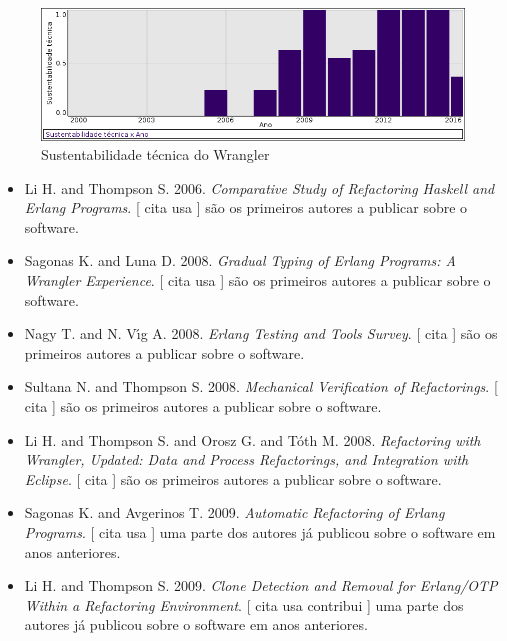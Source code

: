 \begin{figure}[h]
  \center
  \includegraphics[scale=0.50]{imagens/softwares-charts/wrangler.png}
  \caption{Sustentabilidade técnica do Wrangler}
\end{figure}


\begin{itemize}
\item Li H. and Thompson S.
      2006.
        \textit{ Comparative Study of Refactoring Haskell and Erlang Programs}.
      [
          cita
          usa
      ]
são os primeiros autores a publicar sobre o software.
\item Sagonas K. and Luna D.
      2008.
        \textit{ Gradual Typing of Erlang Programs: A Wrangler Experience}.
      [
          cita
          usa
      ]
são os primeiros autores a publicar sobre o software.
\item Nagy T. and N. V\'{\i}g A.
      2008.
        \textit{ Erlang Testing and Tools Survey}.
      [
          cita
      ]
são os primeiros autores a publicar sobre o software.
\item Sultana N. and Thompson S.
      2008.
        \textit{ Mechanical Verification of Refactorings}.
      [
          cita
      ]
são os primeiros autores a publicar sobre o software.
\item Li H. and Thompson S. and Orosz G. and T\'{o}th M.
      2008.
        \textit{ Refactoring with Wrangler, Updated: Data and Process Refactorings, and Integration with Eclipse}.
      [
          cita
      ]
são os primeiros autores a publicar sobre o software.
\item Sagonas K. and Avgerinos T.
      2009.
        \textit{ Automatic Refactoring of Erlang Programs}.
      [
          cita
          usa
      ]
uma parte dos autores já publicou sobre o software em anos anteriores.
\item Li H. and Thompson S.
      2009.
        \textit{ Clone Detection and Removal for Erlang/OTP Within a Refactoring Environment}.
      [
          cita
          usa
          contribui
      ]
uma parte dos autores já publicou sobre o software em anos anteriores.

\end{itemize}
